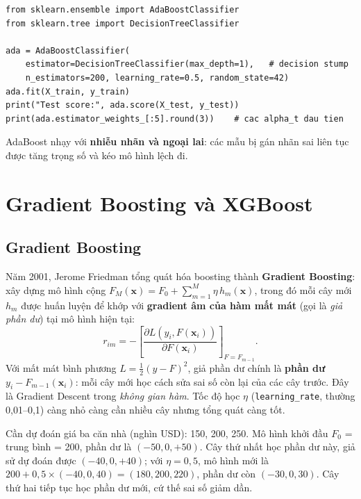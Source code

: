 \begin{lstlisting}[caption={AdaBoost với gốc cây}]
from sklearn.ensemble import AdaBoostClassifier
from sklearn.tree import DecisionTreeClassifier

ada = AdaBoostClassifier(
    estimator=DecisionTreeClassifier(max_depth=1),   # decision stump
    n_estimators=200, learning_rate=0.5, random_state=42)
ada.fit(X_train, y_train)
print("Test score:", ada.score(X_test, y_test))
print(ada.estimator_weights_[:5].round(3))    # cac alpha_t dau tien
\end{lstlisting}

AdaBoost nhạy với \textbf{nhiễu nhãn và ngoại lai}: các mẫu bị gán nhãn sai liên tục được tăng trọng số và kéo mô hình lệch đi.

\section{Gradient Boosting và XGBoost}

\subsection{Gradient Boosting}

Năm 2001, Jerome Friedman tổng quát hóa boosting thành \textbf{Gradient Boosting}: xây dựng mô hình cộng $F_M(\mathbf{x}) = F_0 + \sum_{m=1}^{M} \eta\, h_m(\mathbf{x})$, trong đó mỗi cây mới $h_m$ được huấn luyện để khớp với \textbf{gradient âm của hàm mất mát} (gọi là \textit{giả phần dư}) tại mô hình hiện tại:
\begin{equation}
    r_{im} = -\left[\frac{\partial L(y_i, F(\mathbf{x}_i))}{\partial F(\mathbf{x}_i)}\right]_{F = F_{m-1}} .
\end{equation}
Với mất mát bình phương $L = \frac{1}{2}(y - F)^2$, giả phần dư chính là \textbf{phần dư} $y_i - F_{m-1}(\mathbf{x}_i)$: mỗi cây mới học cách sửa sai số còn lại của các cây trước. Đây là Gradient Descent trong \textit{không gian hàm}. Tốc độ học $\eta$ (\texttt{learning\_rate}, thường 0,01--0,1) càng nhỏ càng cần nhiều cây nhưng tổng quát càng tốt.

\begin{example}
Cần dự đoán giá ba căn nhà (nghìn USD): 150, 200, 250. Mô hình khởi đầu $F_0$ = trung bình = 200, phần dư là $(-50, 0, +50)$. Cây thứ nhất học phần dư này, giả sử dự đoán được $(-40, 0, +40)$; với $\eta = 0{,}5$, mô hình mới là $200 + 0{,}5 \times (-40, 0, 40) = (180, 200, 220)$, phần dư còn $(-30, 0, 30)$. Cây thứ hai tiếp tục học phần dư mới, cứ thế sai số giảm dần.
\end{example}

